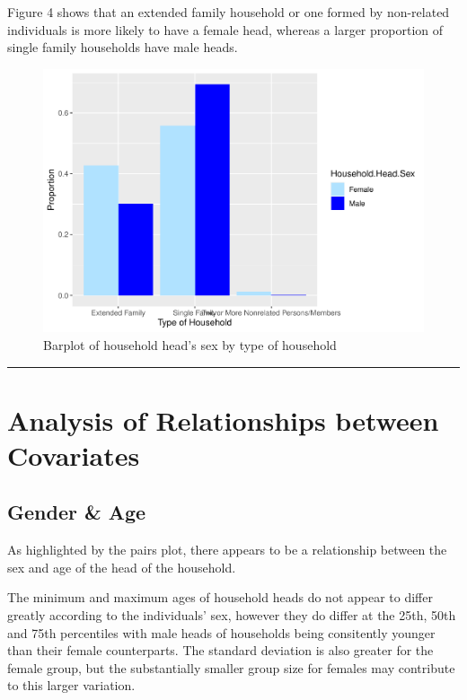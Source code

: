 \documentclass[
]{article}
\begin{document}
Figure 4 shows that an extended family household or one formed by
non-related individuals is more likely to have a female head, whereas a
larger proportion of single family households have male heads.

\begin{figure}[H]

{\centering \includegraphics[width=0.8\linewidth]{Group_01_Project2_demo_files/figure-latex/barplot of sex by type of household-1} 

}

\caption{Barplot of household head's sex by type of household}\label{fig:barplot of sex by type of household}
\end{figure}

\begin{center}\rule{0.5\linewidth}{0.5pt}\end{center}

\newpage

\hypertarget{sec:ARC}{%
\section{Analysis of Relationships between Covariates}\label{sec:ARC}}

\hypertarget{gender-age}{%
\subsection{Gender \& Age}\label{gender-age}}

As highlighted by the pairs plot, there appears to be a relationship
between the sex and age of the head of the household.

The minimum and maximum ages of household heads do not appear to differ
greatly according to the individuals' sex, however they do differ at the
25th, 50th and 75th percentiles with male heads of households being
consitently younger than their female counterparts. The standard
deviation is also greater for the female group, but the substantially
smaller group size for females may contribute to this larger variation.
\end{document}
